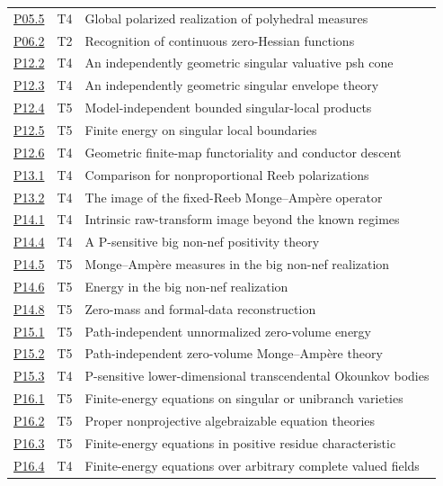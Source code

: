 \documentclass[11pt,a4paper]{article}
\theoremstyle{definition}
\theoremstyle{remark}
\begin{document}
\begin{longtable}{@{}p{}p{}p{}@{}}
\hyperref[atom:P05.5]{P05.5} & T4 & Global polarized realization of polyhedral measures\\
\hyperref[atom:P06.2]{P06.2} & T2 & Recognition of continuous zero-Hessian functions\\
\hyperref[atom:P12.2]{P12.2} & T4 & An independently geometric singular valuative psh cone\\
\hyperref[atom:P12.3]{P12.3} & T4 & An independently geometric singular envelope theory\\
\hyperref[atom:P12.4]{P12.4} & T5 & Model-independent bounded singular-local products\\
\hyperref[atom:P12.5]{P12.5} & T5 & Finite energy on singular local boundaries\\
\hyperref[atom:P12.6]{P12.6} & T4 & Geometric finite-map functoriality and conductor descent\\
\hyperref[atom:P13.1]{P13.1} & T4 & Comparison for nonproportional Reeb polarizations\\
\hyperref[atom:P13.2]{P13.2} & T4 & The image of the fixed-Reeb Monge--Ampère operator\\
\hyperref[atom:P14.1]{P14.1} & T4 & Intrinsic raw-transform image beyond the known regimes\\
\hyperref[atom:P14.4]{P14.4} & T4 & A P-sensitive big non-nef positivity theory\\
\hyperref[atom:P14.5]{P14.5} & T5 & Monge--Ampère measures in the big non-nef realization\\
\hyperref[atom:P14.6]{P14.6} & T5 & Energy in the big non-nef realization\\
\hyperref[atom:P14.8]{P14.8} & T5 & Zero-mass and formal-data reconstruction\\
\hyperref[atom:P15.1]{P15.1} & T5 & Path-independent unnormalized zero-volume energy\\
\hyperref[atom:P15.2]{P15.2} & T5 & Path-independent zero-volume Monge--Ampère theory\\
\hyperref[atom:P15.3]{P15.3} & T4 & P-sensitive lower-dimensional transcendental Okounkov bodies\\
\hyperref[atom:P16.1]{P16.1} & T5 & Finite-energy equations on singular or unibranch varieties\\
\hyperref[atom:P16.2]{P16.2} & T5 & Proper nonprojective algebraizable equation theories\\
\hyperref[atom:P16.3]{P16.3} & T5 & Finite-energy equations in positive residue characteristic\\
\hyperref[atom:P16.4]{P16.4} & T4 & Finite-energy equations over arbitrary complete valued fields\\

\end{longtable}
\end{document}
